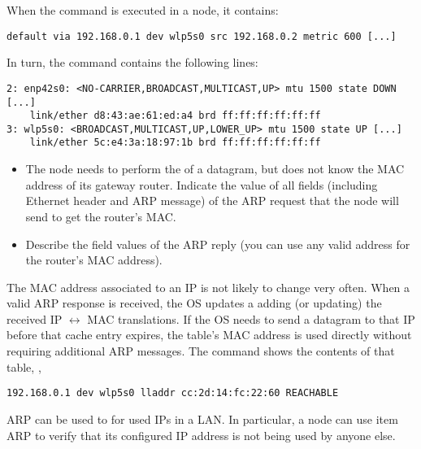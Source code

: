 \begin{exercise}
When the  command is executed in a node, it contains:

\begin{verbatim}
default via 192.168.0.1 dev wlp5s0 src 192.168.0.2 metric 600 [...]
\end{verbatim}

In turn, the  command contains the following lines:

\begin{verbatim}
2: enp42s0: <NO-CARRIER,BROADCAST,MULTICAST,UP> mtu 1500 state DOWN [...]
    link/ether d8:43:ae:61:ed:a4 brd ff:ff:ff:ff:ff:ff
3: wlp5s0: <BROADCAST,MULTICAST,UP,LOWER_UP> mtu 1500 state UP [...]
    link/ether 5c:e4:3a:18:97:1b brd ff:ff:ff:ff:ff:ff 
\end{verbatim}

\begin{itemize}
\item The node needs to perform the  of a datagram,
but does not know the MAC address of its gateway router. Indicate the value of 
all fields (including Ethernet header and ARP message) of the ARP request 
that the node will send to get the router's MAC.

\item Describe the field values of the ARP reply (you can use any valid address
      for the router's MAC address).
\end{itemize}
\end{exercise}

The MAC address associated to an IP is not likely to change very often.
When a valid ARP response is received, the OS updates a 
 adding (or updating) the received IP $\leftrightarrow$ MAC translations.
% 
If the OS needs to send a datagram to that IP before that cache entry expires,
the table's MAC address is used directly without requiring additional ARP messages.
% 
The  command shows the contents of that table, \eg,
\begin{verbatim}
192.168.0.1 dev wlp5s0 lladdr cc:2d:14:fc:22:60 REACHABLE
\end{verbatim}

\begin{remark}
ARP can be used to  for used IPs in a LAN. 
In particular, a node can use item ARP to verify that its configured IP address is not being used by anyone else.
\end{remark}

